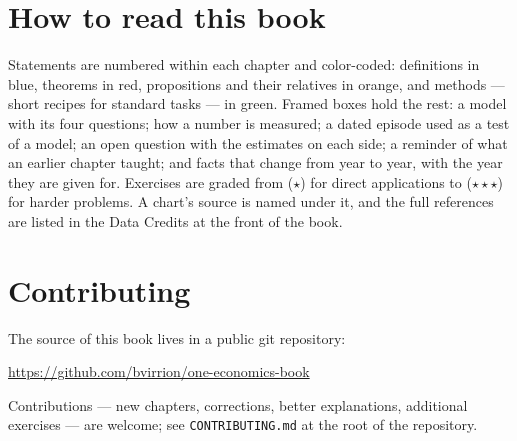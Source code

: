 \section*{How to read this book}

Statements are numbered within each chapter and color-coded: definitions in
blue, theorems in red, propositions and their relatives in orange, and
methods --- short recipes for standard tasks --- in green. Framed boxes hold
the rest: a model with its four questions; how a number is measured; a dated
episode used as a test of a model; an open question with the estimates on
each side; a reminder of what an earlier chapter taught; and facts that change
from year to year, with the year they are given for. Exercises are graded
from ($\star$) for direct applications to ($\star\star\star$) for harder
problems. A chart's source is named under it, and the full references are
listed in the Data Credits at the front of the book.

\section*{Contributing}

The source of this book lives in a public git repository:
\begin{center}
\url{https://github.com/bvirrion/one-economics-book}
\end{center}
Contributions --- new chapters, corrections, better explanations,
additional exercises --- are welcome; see \texttt{CONTRIBUTING.md} at the
root of the repository.
